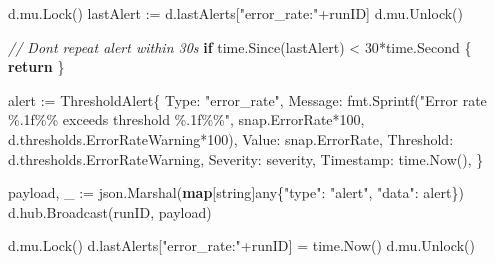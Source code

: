 \documentclass[
]{article}
\newenvironment{Shaded}{}{}
\newcommand{\CommentTok}[1]{\textcolor[rgb]{0.38,0.63,0.69}{\textit{#1}}}
\newcommand{\ControlFlowTok}[1]{\textcolor[rgb]{0.00,0.44,0.13}{\textbf{#1}}}
\newcommand{\DataTypeTok}[1]{\textcolor[rgb]{0.56,0.13,0.00}{#1}}
\newcommand{\DecValTok}[1]{\textcolor[rgb]{0.25,0.63,0.44}{#1}}
\newcommand{\KeywordTok}[1]{\textcolor[rgb]{0.00,0.44,0.13}{\textbf{#1}}}
\newcommand{\NormalTok}[1]{#1}
\newcommand{\OperatorTok}[1]{\textcolor[rgb]{0.40,0.40,0.40}{#1}}
\newcommand{\StringTok}[1]{\textcolor[rgb]{0.25,0.44,0.63}{#1}}
\begin{document}
\begin{Shaded}
\begin{Highlighting}[]
\NormalTok{    d}\OperatorTok{.}\NormalTok{mu}\OperatorTok{.}\NormalTok{Lock}\OperatorTok{()}
\NormalTok{    lastAlert }\OperatorTok{:=}\NormalTok{ d}\OperatorTok{.}\NormalTok{lastAlerts}\OperatorTok{[}\StringTok{"error\_rate:"}\OperatorTok{+}\NormalTok{runID}\OperatorTok{]}
\NormalTok{    d}\OperatorTok{.}\NormalTok{mu}\OperatorTok{.}\NormalTok{Unlock}\OperatorTok{()}

    \CommentTok{// Don\textquotesingle{}t repeat alert within 30s}
    \ControlFlowTok{if}\NormalTok{ time}\OperatorTok{.}\NormalTok{Since}\OperatorTok{(}\NormalTok{lastAlert}\OperatorTok{)} \OperatorTok{\textless{}} \DecValTok{30}\OperatorTok{*}\NormalTok{time}\OperatorTok{.}\NormalTok{Second }\OperatorTok{\{}
        \ControlFlowTok{return}
    \OperatorTok{\}}

\NormalTok{    alert }\OperatorTok{:=}\NormalTok{ ThresholdAlert}\OperatorTok{\{}
\NormalTok{        Type}\OperatorTok{:}      \StringTok{"error\_rate"}\OperatorTok{,}
\NormalTok{        Message}\OperatorTok{:}\NormalTok{   fmt}\OperatorTok{.}\NormalTok{Sprintf}\OperatorTok{(}\StringTok{"Error rate \%.1f\%\% exceeds threshold \%.1f\%\%"}\OperatorTok{,}\NormalTok{ snap}\OperatorTok{.}\NormalTok{ErrorRate}\OperatorTok{*}\DecValTok{100}\OperatorTok{,}\NormalTok{ d}\OperatorTok{.}\NormalTok{thresholds}\OperatorTok{.}\NormalTok{ErrorRateWarning}\OperatorTok{*}\DecValTok{100}\OperatorTok{),}
\NormalTok{        Value}\OperatorTok{:}\NormalTok{     snap}\OperatorTok{.}\NormalTok{ErrorRate}\OperatorTok{,}
\NormalTok{        Threshold}\OperatorTok{:}\NormalTok{ d}\OperatorTok{.}\NormalTok{thresholds}\OperatorTok{.}\NormalTok{ErrorRateWarning}\OperatorTok{,}
\NormalTok{        Severity}\OperatorTok{:}\NormalTok{  severity}\OperatorTok{,}
\NormalTok{        Timestamp}\OperatorTok{:}\NormalTok{ time}\OperatorTok{.}\NormalTok{Now}\OperatorTok{(),}
    \OperatorTok{\}}

\NormalTok{    payload}\OperatorTok{,}\NormalTok{ \_ }\OperatorTok{:=}\NormalTok{ json}\OperatorTok{.}\NormalTok{Marshal}\OperatorTok{(}\KeywordTok{map}\OperatorTok{[}\DataTypeTok{string}\OperatorTok{]}\NormalTok{any}\OperatorTok{\{}\StringTok{"type"}\OperatorTok{:} \StringTok{"alert"}\OperatorTok{,} \StringTok{"data"}\OperatorTok{:}\NormalTok{ alert}\OperatorTok{\})}
\NormalTok{    d}\OperatorTok{.}\NormalTok{hub}\OperatorTok{.}\NormalTok{Broadcast}\OperatorTok{(}\NormalTok{runID}\OperatorTok{,}\NormalTok{ payload}\OperatorTok{)}

\NormalTok{    d}\OperatorTok{.}\NormalTok{mu}\OperatorTok{.}\NormalTok{Lock}\OperatorTok{()}
\NormalTok{    d}\OperatorTok{.}\NormalTok{lastAlerts}\OperatorTok{[}\StringTok{"error\_rate:"}\OperatorTok{+}\NormalTok{runID}\OperatorTok{]} \OperatorTok{=}\NormalTok{ time}\OperatorTok{.}\NormalTok{Now}\OperatorTok{()}
\NormalTok{    d}\OperatorTok{.}\NormalTok{mu}\OperatorTok{.}\NormalTok{Unlock}\OperatorTok{()}


\end{Highlighting}
\end{Shaded}
\end{document}
